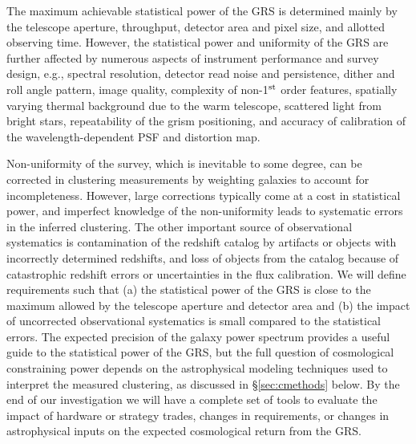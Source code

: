 The maximum achievable statistical power of the GRS is determined
mainly by the telescope aperture, throughput, detector area and pixel
size, and allotted observing time.  However, the statistical power and
uniformity of the GRS are further affected by numerous aspects of
instrument performance and survey design, e.g., spectral resolution,
detector read noise and persistence, dither and roll angle pattern,
image quality, complexity of non-1$^{\rm st}$ order features,
spatially varying thermal background due to the warm telescope,
scattered light from bright stars, repeatability of the grism
positioning, and accuracy of calibration of the wavelength-dependent
PSF and distortion map.

Non-uniformity of the survey, which is inevitable to some degree, can
be corrected in clustering measurements by weighting galaxies to
account for incompleteness.  However, large corrections typically come
at a cost in statistical power, and imperfect knowledge of the
non-uniformity leads to systematic errors in the inferred clustering.
The other important source of observational systematics is
contamination of the redshift catalog by artifacts or objects with
incorrectly determined redshifts, and loss of objects from the catalog
because of catastrophic redshift errors or uncertainties in the flux
calibration.  We will define requirements such that (a) the
statistical power of the GRS is close to the maximum allowed by the
telescope aperture and detector area and (b) the impact of uncorrected
observational systematics is small compared to the statistical
errors. The expected precision of the galaxy power spectrum provides a
useful guide to the statistical power of the GRS, but the full
question of cosmological constraining power depends on the
astrophysical modeling techniques used to interpret the measured
clustering, as discussed in \S\ref{sec:cmethods} below.  By the end of our
investigation we will have a complete set of tools to evaluate the
impact of hardware or strategy trades, changes in requirements, or
changes in astrophysical inputs on the expected cosmological return
from the GRS.


